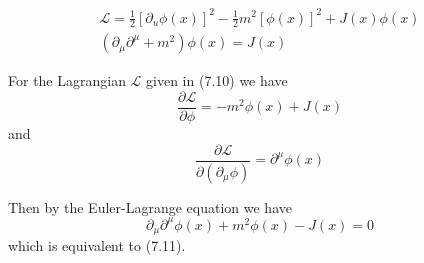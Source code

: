 


\bigskip
\begin{gather*}
\mathcal L=\frac{1}{2}[\partial_u\phi(x)]^2-\frac{1}{2}m^2[\phi(x)]^2
+J(x)\phi(x)
\tag{7.10}
\\
(\partial_\mu\partial^\mu+m^2)\phi(x)=J(x)
\tag{7.11}
\end{gather*}

For the Lagrangian $\mathcal L$ given in (7.10) we have
\begin{equation*}
\frac{\partial\mathcal L}{\partial\phi}=-m^2\phi(x)+J(x)
\end{equation*}
and
\begin{equation*}
\frac{\partial\mathcal L}{\partial(\partial_\mu\phi)}
=\partial^\mu\phi(x)
\end{equation*}

Then by the Euler-Lagrange equation we have
\begin{equation*}
\partial_\mu\partial^\mu\phi(x)+m^2\phi(x)-J(x)=0
\end{equation*}
which is equivalent to (7.11).


